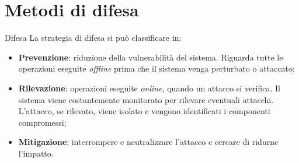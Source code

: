 \documentclass{beamer}
\begin{document}
\section{Metodi di difesa}
\begin{frame}{Difesa}
    La strategia di difesa si può classificare in:
    \begin{itemize}
        \item \textbf{Prevenzione}: riduzione della vulnerabilità del sistema. Riguarda tutte le operazioni eseguite \textit{offline} prima che il sistema venga 
        perturbato o attaccato;
        \item \textbf{Rilevazione}: operazioni eseguite \textit{online}, quando un attacco si verifica. Il sistema viene costantemente monitorato per rilevare
        eventuali attacchi. L'attacco, se rilevato, viene isolato e vengono identificati i componenti compromessi;
        \item \textbf{Mitigazione}: interrompere e neutralizzare l'attacco e cercare di ridurne l'impatto.
    \end{itemize}
    
\end{frame}
\end{document}
